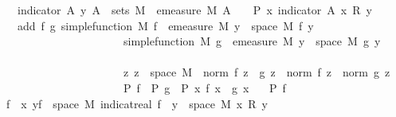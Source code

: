 \begin{isabellebody}
\ \ \ indicator{\isacharcolon}{\kern0pt}\ {\isachardoublequoteopen}{\isasymAnd}A\ y{\isachardot}{\kern0pt}\ A\ {\isasymin}\ sets\ M\ {\isasymLongrightarrow}\ emeasure\ M\ A\ {\isacharless}{\kern0pt}\ {\isasyminfinity}\ {\isasymLongrightarrow}\ P\ {\isacharparenleft}{\kern0pt}{\isasymlambda}x{\isachardot}{\kern0pt}\ indicator\ A\ x\ {\isacharasterisk}{\kern0pt}\isactrlsub R\ y{\isacharparenright}{\kern0pt}{\isachardoublequoteclose}\isanewline
\ \ \ add{\isacharcolon}{\kern0pt}\ {\isachardoublequoteopen}{\isasymAnd}f\ g{\isachardot}{\kern0pt}\ simple{\isacharunderscore}{\kern0pt}function\ M\ f\ {\isasymLongrightarrow}\ emeasure\ M\ {\isacharbraceleft}{\kern0pt}y\ {\isasymin}\ space\ M{\isachardot}{\kern0pt}\ f\ y\ {\isasymnoteq}\ {}{\isacharbraceright}{\kern0pt}\ {\isasymnoteq}\ {\isasyminfinity}\ {\isasymLongrightarrow}\ \isanewline
\ \ \ \ \ \ \ \ \ \ \ \ \ \ \ \ \ \ \ \ \ \ simple{\isacharunderscore}{\kern0pt}function\ M\ g\ {\isasymLongrightarrow}\ emeasure\ M\ {\isacharbraceleft}{\kern0pt}y\ {\isasymin}\ space\ M{\isachardot}{\kern0pt}\ g\ y\ {\isasymnoteq}\ {}{\isacharbraceright}{\kern0pt}\ {\isasymnoteq}\ {\isasyminfinity}\ {\isasymLongrightarrow}\ \isanewline
\ \ \ \ \ \ \ \ \ \ \ \ \ \ \ \ \ \ \ \ \ \ {\isacharparenleft}{\kern0pt}{\isasymAnd}z{\isachardot}{\kern0pt}\ z\ {\isasymin}\ space\ M\ {\isasymLongrightarrow}\ norm\ {\isacharparenleft}{\kern0pt}f\ z\ {\isacharplus}{\kern0pt}\ g\ z{\isacharparenright}{\kern0pt}\ {\isacharequal}{\kern0pt}\ norm\ {\isacharparenleft}{\kern0pt}f\ z{\isacharparenright}{\kern0pt}\ {\isacharplus}{\kern0pt}\ norm\ {\isacharparenleft}{\kern0pt}g\ z{\isacharparenright}{\kern0pt}{\isacharparenright}{\kern0pt}\ {\isasymLongrightarrow}\isanewline
\ \ \ \ \ \ \ \ \ \ \ \ \ \ \ \ \ \ \ \ \ \ P\ f\ {\isasymLongrightarrow}\ P\ g\ {\isasymLongrightarrow}\ P\ {\isacharparenleft}{\kern0pt}{\isasymlambda}x{\isachardot}{\kern0pt}\ f\ x\ {\isacharplus}{\kern0pt}\ g\ x{\isacharparenright}{\kern0pt}{\isachardoublequoteclose}\isanewline
\ \ \ {\isachardoublequoteopen}P\ f{\isachardoublequoteclose}%
\endisatagimportant
{\isafoldimportant}%
%
\isadelimimportant
%
\endisadelimimportant
\isanewline
%
\isadelimproof
%
\endisadelimproof
%
\isatagproof
{}\isamarkupfalse%
{\isacharminus}{\kern0pt}\isanewline
\ \ \isamarkupfalse%
\ {\isacharquery}{\kern0pt}f\ {\isacharequal}{\kern0pt}\ {\isachardoublequoteopen}{\isasymlambda}x{\isachardot}{\kern0pt}\ {\isacharparenleft}{\kern0pt}{\isasymSum}y{\isasymin}f\ {\isacharbackquote}{\kern0pt}\ space\ M{\isachardot}{\kern0pt}\ indicat{\isacharunderscore}{\kern0pt}real\ {\isacharparenleft}{\kern0pt}f\ {\isacharminus}{\kern0pt}{\isacharbackquote}{\kern0pt}\ {\isacharbraceleft}{\kern0pt}y{\isacharbraceright}{\kern0pt}\ {\isasyminter}\ space\ M{\isacharparenright}{\kern0pt}\ x\ {\isacharasterisk}{\kern0pt}\isactrlsub R\ y{\isacharparenright}{\kern0pt}{\isachardoublequoteclose}\isanewline

\end{isabellebody}
